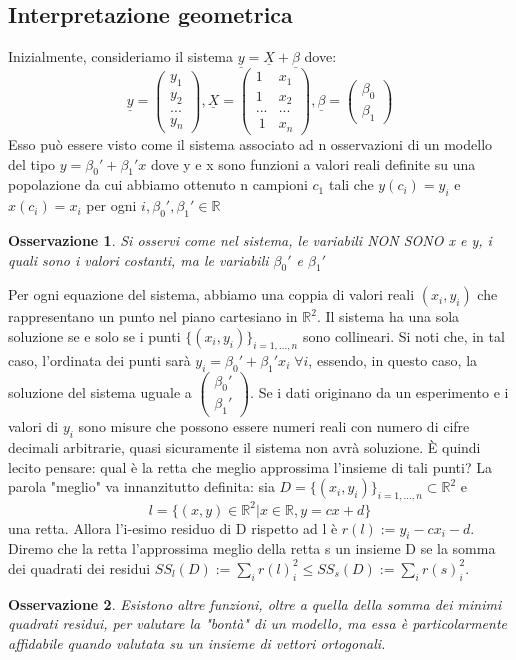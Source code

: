 \documentclass[12pt]{article}
\newenvironment{para}{\begin{adjustwidth}{13mm}{}}{\end{adjustwidth}}
\newtheorem{Osservazione}{Osservazione}[subsection]
\begin{document}
\begin{para}
\subsection{Interpretazione geometrica}
Inizialmente, consideriamo il sistema $\underline{y} = \underline{X} + \underline{\beta}$ dove: $$\underline{y} = \begin{pmatrix}
    y_1 \\
    y_2 \\
    ... \\
    y_n
\end{pmatrix}, \underline{X} = \begin{pmatrix}
    1 & x_1 \\
    1 & x_2 \\
    ... & ... \\\
    1 & x_n
\end{pmatrix}, \underline{\beta} = \begin{pmatrix}
    \beta_0 \\
    \beta_1
\end{pmatrix}$$
Esso può essere visto come il sistema associato ad n osservazioni di un modello del tipo $y = \beta_0' + \beta_1'x$ dove y e x sono funzioni a valori reali definite su una popolazione da cui abbiamo ottenuto n campioni $c_1$ tali che $y(c_i) = y_i$ e $x(c_i)=x_i$ per ogni $i, \beta_0', \beta_1' \in \mathbb{R}$
\begin{Osservazione}
    Si osservi come nel sistema, le variabili NON SONO x e y, i quali sono i valori costanti, ma le variabili $\beta_0'$ e $\beta_1'$
\end{Osservazione}
Per ogni equazione del sistema, abbiamo una coppia di valori reali $(x_i, y_i)$ che rappresentano un punto nel piano cartesiano in $\mathbb{R}^2$. Il sistema ha una sola soluzione se e solo se i punti $\{(x_i, y_i)\}_{i = 1,...,n}$ sono collineari. Si noti che, in tal caso, l'ordinata dei punti sarà $y_i =\beta_0'+\beta_1'x_i \; \forall i$, essendo, in questo caso, la soluzione del sistema uguale a $\begin{pmatrix}
    \beta_0' \\
    \beta_1'
\end{pmatrix}.$\newline
Se i dati originano da un esperimento e i valori di $y_i$ sono misure che possono essere numeri reali con numero di cifre decimali arbitrarie, quasi sicuramente il sistema non avrà soluzione. È quindi lecito pensare: qual è la retta che meglio approssima l'insieme di tali punti? \newline
La parola "meglio" va innanzitutto definita: sia $D = \{(x_i, y_i)\}_{i=1,...,n} \subset \mathbb{R}^2$ e $$l = \{(x,y)\in \mathbb{R}^2 | x\in \mathbb{R}, y = cx + d\}$$ una retta. Allora l'i-esimo residuo di D rispetto ad l è $r(l) := y_i - cx_i -d$. Diremo che la retta l'approssima meglio della retta s un insieme D se la somma dei quadrati dei residui $SS_l(D) := \sum_{i} r(l)_i^2 \leq SS_s(D) := \sum_i r(s)_i^2$.
\begin{Osservazione}
    Esistono altre funzioni, oltre a quella della somma dei minimi quadrati residui, per valutare la "bontà" di un modello, ma essa è particolarmente affidabile quando valutata su un insieme di vettori ortogonali.  
\end{Osservazione}

\end{para}
\end{document}
